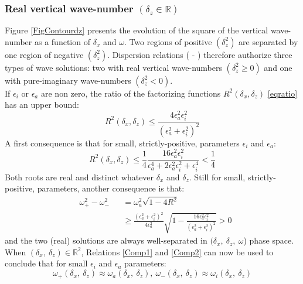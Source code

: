 \documentclass[a4paper,11pt]{article}
\begin{document}
\subsubsection{Real vertical wave-number $(\delta_z\in\mathbb{R})$}
Figure \ref{FigContourdz} presents the evolution of the square of the vertical wave-number as a function of $\delta_x$ and $\omega$. Two regions of positive $(\delta_z^2)$ are separated by one region of negative $(\delta_z^2)$. Dispersion relations ( - ) therefore authorize three types of wave solutions: two with real vertical wave-numbers $(\delta_z^2\geq0)$ and one with pure-imaginary wave-numbers $(\delta_z^2<0)$. \\

If $\epsilon_i$ or $\epsilon_a$ are non zero, the ratio of the factorizing functions $\displaystyle R^2(\delta_x,\delta_z)$ \ref{eqratio} has an upper bound:
\begin{equation}
	 R^2(\delta_x,\delta_z) \leq
	\frac{4\epsilon_a^2\epsilon_i^2}{\left
	(\epsilon_a^2+\epsilon_i^2
	\right)^2}
\end{equation}
A first consequence is that for small, strictly-positive, parameters $\epsilon_i$ and $\epsilon_a$:
\begin{equation}
	 R^2(\delta_x,\delta_z) 
	\leq
	\frac{1}{4}
	\frac{16\epsilon_a^2\epsilon_i^2}{\epsilon_a^4+2\epsilon_a^2\epsilon_i^2+\epsilon_i^4} 
	<
	\frac{1}{4}
\end{equation}
Both roots are real and distinct whatever $\delta_x$ and $\delta_z$. Still for small, strictly-positive, parameters, another consequence is that:
\begin{subequations}
	\begin{alignat}{2}	
	&\omega_{+}^2-\omega_{-}^2 &&=\omega_a^2\sqrt{1-4 R^2}\\[3mm]
	\label{deltaomegapm}
	& &&\geq \frac{(\epsilon_a^2+\epsilon_i^2)^2}{4\epsilon_a^2}
	\sqrt{1-\frac{16\epsilon_a^2\epsilon_i^2}{\left
	(\epsilon_a^2+\epsilon_i^2
	\right)^2}}>0
	\end{alignat}
\end{subequations}
and the two (real) solutions are always well-separated in $(\delta_x,\ \delta_z,\ \omega$) phase space.\\
When $(\delta_x,\ \delta_z)\in \mathbb{R}^2$, Relations \ref{Comp1} and \ref{Comp2} can now be used to conclude that for small $\epsilon_i$ and $\epsilon_a$ parameters:
\begin{equation}
	\omega_{+}(\delta_x,\ \delta_z) \approx \omega_a(\delta_x,\ \delta_z),\ 
	\omega_{-}(\delta_x,\ \delta_z) \approx \omega_i
	(\delta_x,\ \delta_z)
\end{equation}
\end{document}

